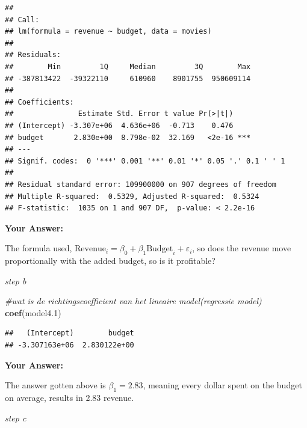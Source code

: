 \documentclass[
]{article}
\newenvironment{Shaded}{\begin{snugshade}}{\end{snugshade}}
\newcommand{\CommentTok}[1]{\textcolor[rgb]{0.56,0.35,0.01}{\textit{#1}}}
\newcommand{\FloatTok}[1]{\textcolor[rgb]{0.00,0.00,0.81}{#1}}
\newcommand{\FunctionTok}[1]{\textcolor[rgb]{0.13,0.29,0.53}{\textbf{#1}}}
\newcommand{\NormalTok}[1]{#1}
\begin{document}
\begin{verbatim}
## 
## Call:
## lm(formula = revenue ~ budget, data = movies)
## 
## Residuals:
##        Min         1Q     Median         3Q        Max 
## -387813422  -39322110     610960    8901755  950609114 
## 
## Coefficients:
##               Estimate Std. Error t value Pr(>|t|)    
## (Intercept) -3.307e+06  4.636e+06  -0.713    0.476    
## budget       2.830e+00  8.798e-02  32.169   <2e-16 ***
## ---
## Signif. codes:  0 '***' 0.001 '**' 0.01 '*' 0.05 '.' 0.1 ' ' 1
## 
## Residual standard error: 109900000 on 907 degrees of freedom
## Multiple R-squared:  0.5329, Adjusted R-squared:  0.5324 
## F-statistic:  1035 on 1 and 907 DF,  p-value: < 2.2e-16
\end{verbatim}

\textbf{Your Answer:}

The formula used,
\(\text{Revenue}_i = \beta_0 + \beta_1 \text{Budget}_i + \varepsilon_i\),
so does the revenue move proportionally with the added budget, so is it
profitable?

\emph{step b}

\begin{Shaded}
\begin{Highlighting}[]
\CommentTok{\#wat is de richtingscoefficient van het lineaire model(regressie model)}
\FunctionTok{coef}\NormalTok{(model4}\FloatTok{.1}\NormalTok{)}
\end{Highlighting}
\end{Shaded}

\begin{verbatim}
##   (Intercept)        budget 
## -3.307163e+06  2.830122e+00
\end{verbatim}

\textbf{Your Answer:}

The answer gotten above is \(\beta_1 = 2.83\), meaning every dollar
spent on the budget on average, results in 2.83 revenue.

\emph{step c}
\end{document}
